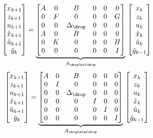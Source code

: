 %
\begin{equation}
    \begin{bmatrix}
        x_{k+1} \\
        z_{k+1} \\
        u_{k+1} \\
        \hat x_{k+1} \\
        \hat u_{k+1} \\
        \hat y_{k} \\
    \end{bmatrix} = \underbrace{\begin{bmatrix}
        A & 0 & B & 0 & 0 & 0 \\
        0 & F & 0 & 0 & 0 & G \\
        0 & 0 & \Delta_\drop & 0 & 0 & 0 \\
        A & 0 & B & 0 & 0 & 0 \\
        0 & K & 0 & 0 & 0 & H \\
        0 & 0 & 0 & 0 & 0 & I
    \end{bmatrix}}_{A_{\drop\hit\drop}}\, \begin{bmatrix}
        x_{k} \\
        z_{k} \\
        u_{k} \\
        \hat x_{k} \\
        \hat u_{k} \\
        \hat y_{k-1} \\
    \end{bmatrix}
\end{equation}
%
\begin{equation}
    \begin{bmatrix}
        x_{k+1} \\
        z_{k+1} \\
        u_{k+1} \\
        \hat x_{k+1} \\
        \hat u_{k+1} \\
        \hat y_{k} \\
    \end{bmatrix} = \underbrace{\begin{bmatrix}
        A & 0 & B & 0 & 0 & 0 \\
        0 & I & 0 & 0 & 0 & 0 \\
        0 & 0 & \Delta_\drop & 0 & 0 & 0 \\
        0 & 0 & 0 & I & 0 & 0 \\
        0 & 0 & 0 & 0 & I & 0 \\
        0 & 0 & 0 & 0 & 0 & I
    \end{bmatrix}}_{A_{\drop\miss\drop}}\, \begin{bmatrix}
        x_{k} \\
        z_{k} \\
        u_{k} \\
        \hat x_{k} \\
        \hat u_{k} \\
        \hat y_{k-1} \\
    \end{bmatrix}
\end{equation}
